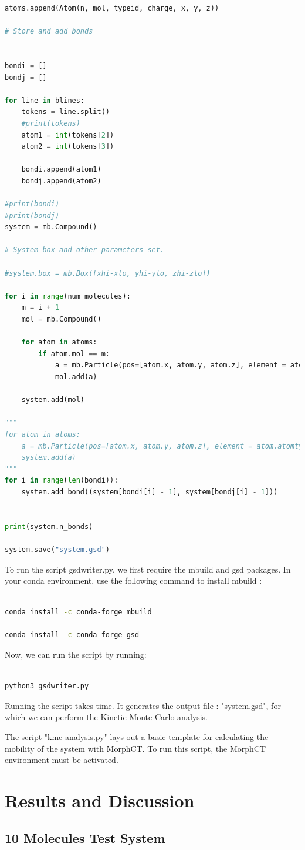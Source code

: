 \documentclass{article}
\begin{document}
\begin{lstlisting}[language=python]
    atoms.append(Atom(n, mol, typeid, charge, x, y, z))

# Store and add bonds


bondi = []
bondj = []

for line in blines:
    tokens = line.split()
    #print(tokens)
    atom1 = int(tokens[2])
    atom2 = int(tokens[3])

    bondi.append(atom1)
    bondj.append(atom2)

#print(bondi)
#print(bondj)
system = mb.Compound()

# System box and other parameters set.

#system.box = mb.Box([xhi-xlo, yhi-ylo, zhi-zlo])

for i in range(num_molecules):
    m = i + 1
    mol = mb.Compound()

    for atom in atoms:
        if atom.mol == m:
            a = mb.Particle(pos=[atom.x, atom.y, atom.z], element = atom.atomtype, name=atom.atomtype, charge= atom.charge)
            mol.add(a)

    system.add(mol)

"""
for atom in atoms:
    a = mb.Particle(pos=[atom.x, atom.y, atom.z], element = atom.atomtype, name=atom.atomtype, charge= atom.charge)
    system.add(a)
"""
for i in range(len(bondi)):
    system.add_bond((system[bondi[i] - 1], system[bondj[i] - 1]))


print(system.n_bonds)

system.save("system.gsd")


\end{lstlisting}

To run the script gsdwriter.py, we first require the mbuild and gsd packages. In your conda environment, use the following command to install mbuild :

\begin{lstlisting}[language=bash]

conda install -c conda-forge mbuild

conda install -c conda-forge gsd

\end{lstlisting}

Now, we can run the script by running:

\begin{lstlisting}[language=bash]

python3 gsdwriter.py

\end{lstlisting}


Running the script takes time. It generates the output file : "system.gsd", for which we can perform the Kinetic Monte Carlo analysis.

The script "kmc-analysis.py" lays out a basic template for calculating the mobility of the system with MorphCT. To run this script, the MorphCT environment must be activated.


\section{Results and Discussion}

\subsection{10 Molecules Test System}


\end{document}

